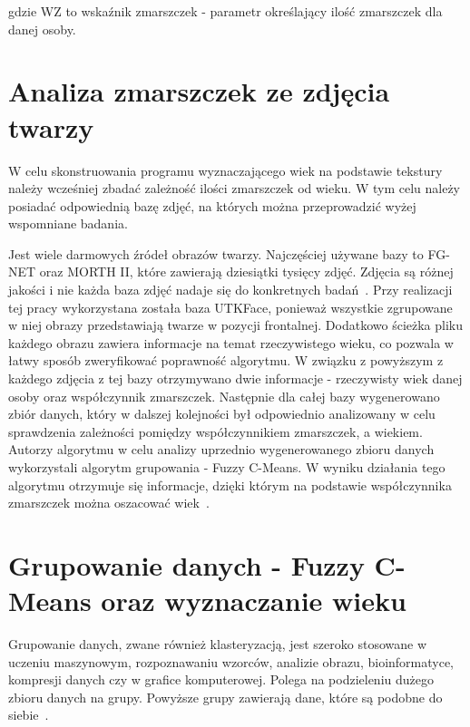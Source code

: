 \documentclass[a4paper,twoside,12pt]{book}
\begin{document}
    gdzie WZ to wskaźnik zmarszczek - parametr określający ilość zmarszczek dla danej osoby.
    \section{Analiza zmarszczek ze zdjęcia twarzy}\label{sec:algorytmTrenowania}
    W celu skonstruowania programu wyznaczającego wiek na podstawie tekstury należy wcześniej zbadać zależność ilości
    zmarszczek od wieku.
    W tym celu należy posiadać odpowiednią bazę zdjęć, na których można przeprowadzić wyżej wspomniane badania.

    Jest wiele darmowych źródeł obrazów twarzy.
    Najczęściej używane bazy to FG-NET oraz MORTH II, które
    zawierają dziesiątki tysięcy zdjęć.
    Zdjęcia są różnej jakości i nie każda baza zdjęć nadaje się do konkretnych badań~\cite{khryashchevGanin}.
    Przy realizacji tej pracy wykorzystana została baza UTKFace,
    ponieważ wszystkie zgrupowane w niej obrazy przedstawiają twarze w pozycji frontalnej. Dodatkowo
    ścieżka pliku każdego obrazu zawiera informacje na temat rzeczywistego wieku, co pozwala w łatwy sposób
    zweryfikować poprawność algorytmu.
    W związku z powyższym z każdego zdjęcia z tej bazy otrzymywano dwie informacje - rzeczywisty wiek danej osoby oraz
    współczynnik zmarszczek.
    Następnie dla całej bazy wygenerowano zbiór danych, który w dalszej kolejności był odpowiednio analizowany w celu
    sprawdzenia zależności pomiędzy współczynnikiem zmarszczek, a wiekiem.
    Autorzy algorytmu w celu analizy uprzednio wygenerowanego zbioru danych wykorzystali algorytm grupowania -
    Fuzzy C-Means.
    W wyniku działania tego algorytmu otrzymuje się informacje, dzięki którym na podstawie współczynnika zmarszczek
    można
    oszacować wiek~\cite{wrinkleFeatures}. %
    \section{Grupowanie danych - Fuzzy C-Means oraz wyznaczanie wieku}\label{sec:grupowanieDanych}
    Grupowanie danych, zwane również klasteryzacją, jest szeroko stosowane w uczeniu maszynowym, rozpoznawaniu wzorców,
    analizie obrazu, bioinformatyce, kompresji danych czy w grafice komputerowej.
    Polega na podzieleniu dużego zbioru danych na grupy.
    Powyższe grupy zawierają dane, które są podobne do siebie~\cite{clusterWstep}.
\end{document}
